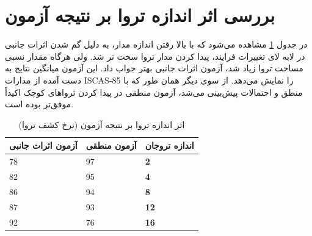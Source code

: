 \section{بررسی اثر اندازه تروا بر نتیجه آزمون}
در جدول \ref{tsize} مشاهده می‌شود که با بالا رفتن اندازه مدار، به دلیل گم شدن اثرات جانبی در لابه لای تغییرات فرایند، پیدا کردن مدار تروا سخت تر شد. ولی هرگاه مقدار نسبی مساحت تروا زیاد شد، آزمون اثرات جانبی بهتر جواب داد. این آزمون میانگین نتایج به دست آمده از مدارات ISCAS-85 را نمایش می‌دهد. از سوی دیگر همان طور که با منطق و احتمالات پیش‌بینی می‌شد، آزمون منطقی در پیدا کردن تروا‌های کوچک اکیداً موفق‌تر بوده است.
\begin{table}[t]
	
	\begin{center} 
		\begin{tabular}{| p{4cm} | p{4cm} |p{1cm}|}
			\hline
			\textbf{ آزمون اثرات جانبی} & \textbf{ آزمون منطقی} & \textbf{اندازه تروجان}\\ \hline \hline
			78 & 97 &\textbf{2} \\ \hline
			82 & 95 &\textbf{4} \\ \hline
			86 & 94 &\textbf{8} \\ \hline
			87 & 93 &\textbf{12} \\ \hline
			92 & 76 &\textbf{16} \\ \hline
		\end{tabular}
		\caption{
			اثر اندازه تروا بر نتیجه آزمون (نرخ کشف تروا)}
		\label{tsize}
	\end{center}
\end{table}

